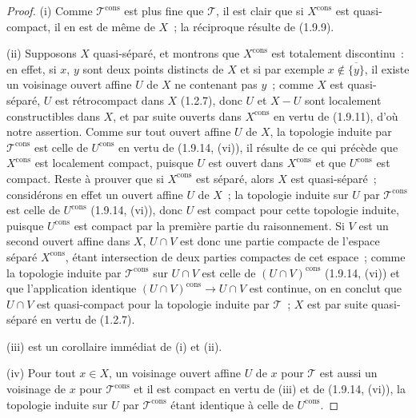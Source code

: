\begin{proof}
(i) Comme $\mathscr T^{\mathrm{cons}}$ est plus fine que $\mathscr T$, il est
clair que si $X^{\mathrm{cons}}$ est quasi-compact, il en est de même de $X$~;
la réciproque résulte de (1.9.9).

(ii) Supposons $X$ quasi-séparé, et montrons que $X^{\mathrm{cons}}$ est
totalement discontinu~: en effet, si $x$, $y$ sont deux points distincts de
$X$ et si par exemple $x\notin\overline{\{y\}}$, il existe un
voisinage ouvert affine $U$ de $X$ ne contenant pas $y$~; comme $X$ est
quasi-séparé, $U$ est rétrocompact dans $X$ (1.2.7), donc $U$ et $X-U$ sont
localement constructibles dans $X$, et par suite ouverts dans
$X^{\mathrm{cons}}$ en vertu de (1.9.11), d'où notre assertion. Comme sur tout
ouvert affine $U$ de $X$, la topologie induite par $\mathscr T^{\mathrm{cons}}$
est celle de $U^{\mathrm{cons}}$ en vertu de (1.9.14, (vi)), il résulte de ce
qui précède que $X^{\mathrm{cons}}$ est localement compact, puisque $U$ est
ouvert dans $X^{\mathrm{cons}}$ et que $U^{\mathrm{cons}}$ est compact. Reste à
prouver que si $X^{\mathrm{cons}}$ est séparé, alors $X$ est quasi-séparé~;
considérons en effet un ouvert affine $U$ de $X$~; la topologie induite sur
$U$ par $\mathscr T^{\mathrm{cons}}$ est celle de $U^{\mathrm{cons}}$
(1.9.14, (vi)), donc $U$ est compact pour cette topologie induite, puisque
$U^{\mathrm{cons}}$ est compact par la première partie du raisonnement. Si
$V$ est un second ouvert affine dans $X$, $U\cap V$ est donc une partie
compacte de l'espace séparé $X^{\mathrm{cons}}$, étant intersection de deux
parties compactes de cet espace~; comme la topologie induite par
$\mathscr T^{\mathrm{cons}}$ sur $U\cap V$ est celle de
$(U\cap V)^{\mathrm{cons}}$ (1.9.14, (vi)) et que l'application identique
$(U\cap V)^{\mathrm{cons}}\to U\cap V$ est continue, on en conclut que
$U\cap V$ est quasi-compact pour la topologie induite par $\mathscr T$~; $X$
est par suite quasi-séparé en vertu de (1.2.7).

(iii) est un corollaire immédiat de (i) et (ii).

(iv) Pour tout $x\in X$, un voisinage ouvert affine $U$ de $x$ pour
$\mathscr T$ est aussi un voisinage de $x$ pour $\mathscr T^{\mathrm{cons}}$
et il est compact en vertu de (iii) et de (1.9.14, (vi)), la topologie induite
sur $U$ par $\mathscr T^{\mathrm{cons}}$ étant identique à celle de
$U^{\mathrm{cons}}$.


\end{proof}
